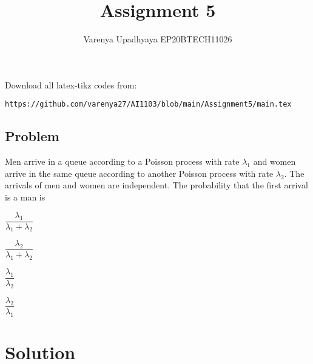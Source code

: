 \documentclass[journal,12pt,twocolumn]{IEEEtran}
\title{Assignment 5}
\author{Varenya Upadhyaya EP20BTECH11026}
\date{}
\theoremstyle{remark}
\numberwithin{equation}{subsection}
\begin{document}
\maketitle
Download all latex-tikz codes from:
\begin{lstlisting}
https://github.com/varenya27/AI1103/blob/main/Assignment5/main.tex
\end{lstlisting}
\maketitle   
\begin{center}
\section*{\textbf{Problem}}
\end{center}
Men arrive in a queue according to a Poisson process with rate $\lambda_1$ and women arrive in the same queue according to another Poisson process with rate $\lambda_2$. The arrivals of men and women are independent. The probability that the first arrival is a man is
\begin{enumerate}[label = (\alph*)]
\begin{multicols}{4}
\setlength\itemsep{2em}
    \item $\dfrac{\lambda_1}{\lambda_1+\lambda_2}$
    \item $\dfrac{\lambda_2}{\lambda_1+\lambda_2}$
    \item $\dfrac{\lambda_1}{\lambda_2}$
    \item $\dfrac{\lambda_2}{\lambda_1}$
\end{multicols}
\end{enumerate}

\maketitle
\section*{\textbf{Solution}}
\end{document}
